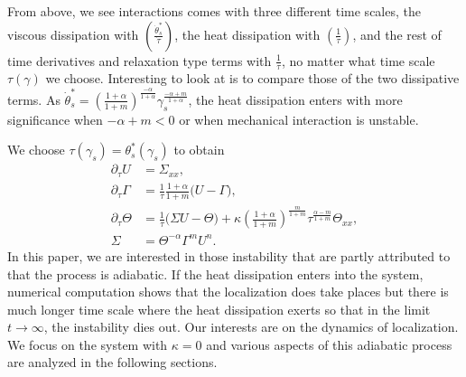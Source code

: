\documentclass[a4paper,11pt]{article}
\theoremstyle{remark}
\begin{document}
From above, we see interactions comes with three different time scales, the viscous dissipation with $\left(\frac{\dot\theta^*_s}{\dot{\tau}}\right)$, the heat dissipation with $\left(\frac{1}{\dot\tau}\right)$, and the rest of time derivatives and relaxation type terms with $\frac{1}{\tau}$, no matter what time scale $\tau(\gamma)$ we choose. Interesting to look at is to compare those of the two dissipative terms. As $\dot\theta^*_s = \left( \frac{1+\alpha}{1+m}\right)^{\frac{-\alpha}{1+\alpha}}\gamma_s^{\frac{-\alpha+m}{1+\alpha}}$, the heat dissipation enters with more significance when $-\alpha+m<0$ or when mechanical interaction is unstable. 


We choose $\tau(\gamma_s) = \theta_s^*(\gamma_s)$ to obtain
\begin{equation} 
 \begin{aligned}
  \partial_\tau U &= \Sigma_{xx},\\
  \partial_\tau \Gamma &= \frac{1}{\tau}\frac{1+\alpha}{1+m} \Big(U-\Gamma\Big),\\
  \partial_\tau \Theta &= \frac{1}{\tau}\Big(\Sigma U - \Theta\Big) + \kappa\left(\frac{1+\alpha}{1+m}\right)^{\frac{m}{1+m}}\tau^{\frac{\alpha-m}{1+m}}\Theta_{xx}, \\
  \Sigma&=\Theta^{-\alpha}\Gamma^m U^n.
 \end{aligned}
\end{equation}
In this paper, we are interested in those instability that are partly attributed to that the process is adiabatic. If the heat dissipation enters into the system, numerical computation shows that the localization does take places but there is much longer time scale where the heat dissipation exerts so that in the limit $t \rightarrow \infty$, the instability dies out. Our interests are on the dynamics of localization. We focus on the system with $\kappa=0$ and various aspects of this adiabatic process are  analyzed in the following sections.

\end{document}
